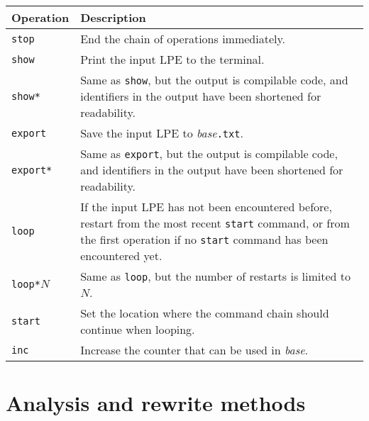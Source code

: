 \begin{tabularx}{\linewidth}{l|X|}
\textbf{Operation} & \textbf{Description} \\ \hline
\texttt{stop} & End the chain of operations immediately. \\ \hline
\texttt{show} & Print the input LPE to the terminal. \\ \hline
\texttt{show*} & Same as \texttt{show}, but the output is compilable \txs{} code, and identifiers in the output have been shortened for readability. \\ \hline
\texttt{export} & Save the input LPE to \textit{base}\texttt{.txt}. \\ \hline
\texttt{export*} & Same as \texttt{export}, but the output is compilable \txs{} code, and identifiers in the output have been shortened for readability. \\ \hline
\texttt{loop} & If the input LPE has not been encountered before, restart from the most recent \texttt{start} command, or from the first operation if no \texttt{start} command has been encountered yet. \\ \hline
\texttt{loop*}$N$ & Same as \texttt{loop}, but the number of restarts is limited to $N$. \\ \hline
\texttt{start} & Set the location where the command chain should continue when looping. \\ \hline
\texttt{inc} & Increase the counter that can be used in \textit{base}. \\ \hline
\end{tabularx}

\section{Analysis and rewrite methods}

